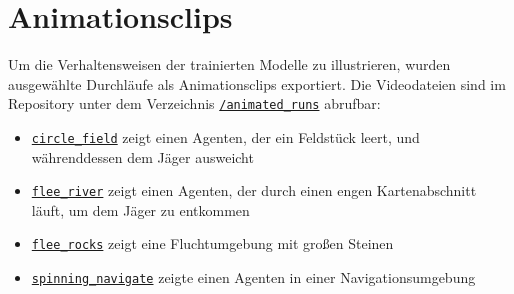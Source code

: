 \section{Animationsclips}
\label{app:animations}

Um die Verhaltensweisen der trainierten Modelle zu illustrieren, wurden ausgewählte Durchläufe als Animationsclips exportiert. Die Videodateien sind im Repository unter dem Verzeichnis \href{https://github.com/fynn-madrian/predator_prey_simulation/tree/single_agent/animated_runs}{\texttt{/animated\_runs}} abrufbar:

\begin{itemize}
\item \href{https://github.com/fynn-madrian/predator_prey_simulation/blob/single_agent/animated_runs/circle_field.gif}{\texttt{circle\_field}} zeigt einen Agenten, der ein Feldstück leert, und währenddessen dem Jäger ausweicht
\item \href{https://github.com/fynn-madrian/predator_prey_simulation/blob/single_agent/animated_runs/flee_river.gif}{\texttt{flee\_river}} zeigt einen Agenten, der durch einen engen Kartenabschnitt läuft, um dem Jäger zu entkommen
\item \href{https://github.com/fynn-madrian/predator_prey_simulation/blob/single_agent/animated_runs/flee_rocks.gif}{\texttt{flee\_rocks}} zeigt eine Fluchtumgebung mit großen Steinen
\item \href{https://github.com/fynn-madrian/predator_prey_simulation/blob/single_agent/animated_runs/spinning_navigate.gif}{\texttt{spinning\_navigate}} zeigte einen Agenten in einer Navigationsumgebung
\end{itemize}
